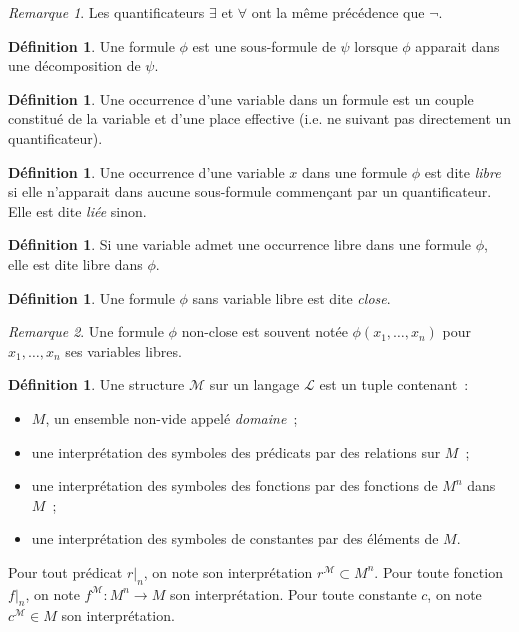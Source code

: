 \documentclass{article}
\theoremstyle{definition}
\newtheorem{déf}[thm]{Définition}
\theoremstyle{remark}
\newtheorem*{rmq}{Remarque}
\begin{document}
	\begin{rmq} Les quantificateurs $\exists$ et $\forall$ ont la même précédence que $\lnot$.
	\end{rmq}

	\begin{déf} Une formule $\phi$ est une sous-formule de $\psi$ lorsque $\phi$ apparait dans une décomposition de $\psi$.
	\end{déf}

	\begin{déf} Une occurrence d'une variable dans un formule est un couple constitué de la variable et d'une place effective (i.e. ne suivant pas directement
	un quantificateur).
	\end{déf}

	\begin{déf} Une occurrence d'une variable $x$ dans une formule $\phi$ est dite \textit{libre} si elle n'apparait dans aucune sous-formule commençant par
	un quantificateur. Elle est dite \textit{liée} sinon.
	\end{déf}

	\begin{déf} Si une variable admet une occurrence libre dans une formule $\phi$, elle est dite libre dans $\phi$.
	\end{déf}

	\begin{déf} Une formule $\phi$ sans variable libre est dite \textit{close}.
	\end{déf}

	\begin{rmq} Une formule $\phi$ non-close est souvent notée $\phi(x_1, \ldots, x_n)$ pour $x_1, \ldots, x_n$ ses variables libres.
	\end{rmq}

	\begin{déf} Une structure $\mathcal M$ sur un langage $\mathcal L$ est un tuple contenant~:
	\begin{itemize}
		\item $M$, un ensemble non-vide appelé \textit{domaine}~;
		\item une interprétation des symboles des prédicats par des relations sur $M$~;
		\item une interprétation des symboles des fonctions par des fonctions de $M^n$ dans $M$~;
		\item une interprétation des symboles de constantes par des éléments de $M$.
	\end{itemize}

	Pour tout prédicat $r|_n$, on note son interprétation $r^{\mathcal M} \subset M^n$. Pour toute fonction $f|_n$, on note $f^{\mathcal M} : M^n \to M$
	son interprétation. Pour toute constante $c$, on note $c^{\mathcal M} \in M$ son interprétation.
	\end{déf}
\end{document}
